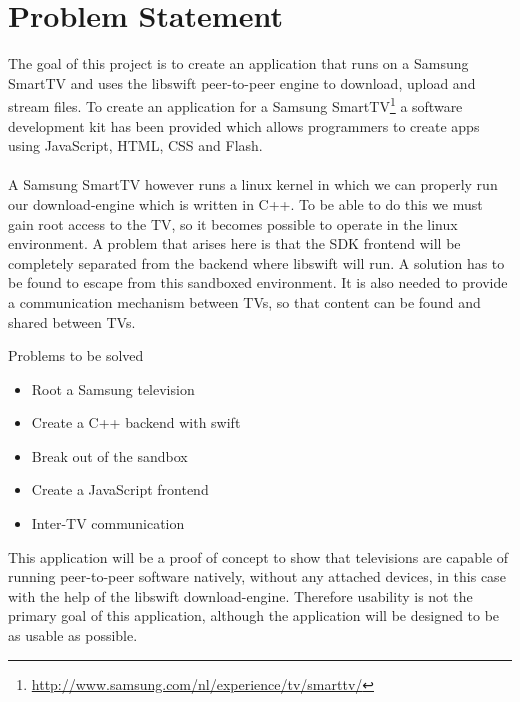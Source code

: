 \chapter{Problem Statement}
\label{sec:problems}
The goal of this project is to create an application that runs on a Samsung SmartTV and uses the libswift peer-to-peer engine to download, upload and stream files. To create an application for a Samsung SmartTV\footnote{\url{http://www.samsung.com/nl/experience/tv/smarttv/}} a software development kit has been provided which allows programmers to create apps using JavaScript, HTML, CSS and Flash.\\\\
A Samsung SmartTV however runs a linux kernel in which we can properly run our download-engine which is written in C++. To be able to do this we must gain root access to the TV, so it becomes possible to operate in the linux environment. A problem that arises here is that the SDK frontend will be completely separated from the backend where libswift will run. A solution has to be found to escape from this sandboxed environment. It is also needed to provide a communication mechanism between TV\textquotesingle s,
so that content can be found and shared between TV\textquotesingle s.

Problems to be solved
\begin{itemize}
\item Root a Samsung television
\item Create a C++ backend with swift
\item Break out of the sandbox
\item Create a JavaScript frontend
\item Inter-TV communication
\end{itemize}

This application will be a proof of concept to show that televisions are capable of running peer-to-peer software natively, without any attached
devices, in this case with the help of the libswift download-engine. Therefore usability is not the primary goal of this application, 
although the application will be designed to be as usable as possible.
